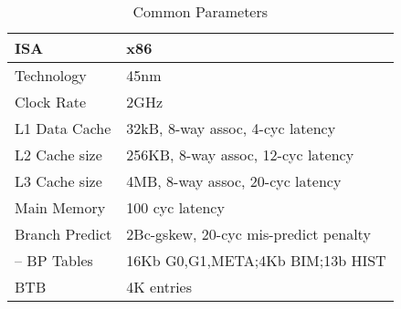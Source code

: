 \begin{table}[!htbp]
\centering
\begin{tabular}{ l|l }
\hline
ISA					&x86\\ \hline
Technology          &45nm \\ \hline
Clock Rate          &2GHz\\ \hline
L1 Data Cache       &32kB, 8-way assoc, 4-cyc latency\\ \hline
L2 Cache size       &256KB, 8-way assoc, 12-cyc latency\\ \hline
L3 Cache size       &4MB, 8-way assoc, 20-cyc latency\\ \hline
Main Memory         &100 cyc latency\\ \hline
Branch Predict	    &2Bc-gskew, 20-cyc mis-predict penalty\\ \hline
-- BP Tables        &16Kb G0,G1,META;4Kb BIM;13b HIST\\ \hline
BTB                 &4K entries \\ \hline
\end{tabular}
\caption{Common Parameters}
\label{tab:params}
\end{table}

